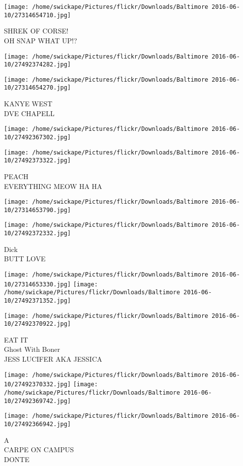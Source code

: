 \documentclass[10pt,letterpaper]{article}
\begin{document}
\vspace{0.25in}
\texttt{[image: /home/swickape/Pictures/flickr/Downloads/Baltimore 2016-06-10/27314654710.jpg]}

SHREK OF CORSE!\\
OH SNAP WHAT UP!?\\
\pagebreak

\texttt{[image: /home/swickape/Pictures/flickr/Downloads/Baltimore 2016-06-10/27492374282.jpg]}

\vspace{0.25in}
\texttt{[image: /home/swickape/Pictures/flickr/Downloads/Baltimore 2016-06-10/27314654270.jpg]}

KANYE WEST\\
DVE CHAPELL\\
\pagebreak

\texttt{[image: /home/swickape/Pictures/flickr/Downloads/Baltimore 2016-06-10/27492367302.jpg]}

\vspace{0.25in}
\texttt{[image: /home/swickape/Pictures/flickr/Downloads/Baltimore 2016-06-10/27492373322.jpg]}

PEACH\\
EVERYTHING MEOW HA HA\\
\pagebreak

\texttt{[image: /home/swickape/Pictures/flickr/Downloads/Baltimore 2016-06-10/27314653790.jpg]}

\vspace{0.25in}
\texttt{[image: /home/swickape/Pictures/flickr/Downloads/Baltimore 2016-06-10/27492372332.jpg]}

Dick\\
BUTT LOVE\\
\pagebreak

\texttt{[image: /home/swickape/Pictures/flickr/Downloads/Baltimore 2016-06-10/27314653330.jpg]}
\texttt{[image: /home/swickape/Pictures/flickr/Downloads/Baltimore 2016-06-10/27492371352.jpg]}

\vspace{0.25in}
\texttt{[image: /home/swickape/Pictures/flickr/Downloads/Baltimore 2016-06-10/27492370922.jpg]}

EAT IT\\
Ghost With Boner\\
JESS LUCIFER AKA JESSICA\\
\pagebreak

\texttt{[image: /home/swickape/Pictures/flickr/Downloads/Baltimore 2016-06-10/27492370332.jpg]}
\texttt{[image: /home/swickape/Pictures/flickr/Downloads/Baltimore 2016-06-10/27492369742.jpg]}

\texttt{[image: /home/swickape/Pictures/flickr/Downloads/Baltimore 2016-06-10/27492366942.jpg]}

A\\
CARPE ON CAMPUS\\
DONTE\\
\pagebreak
\end{document}
